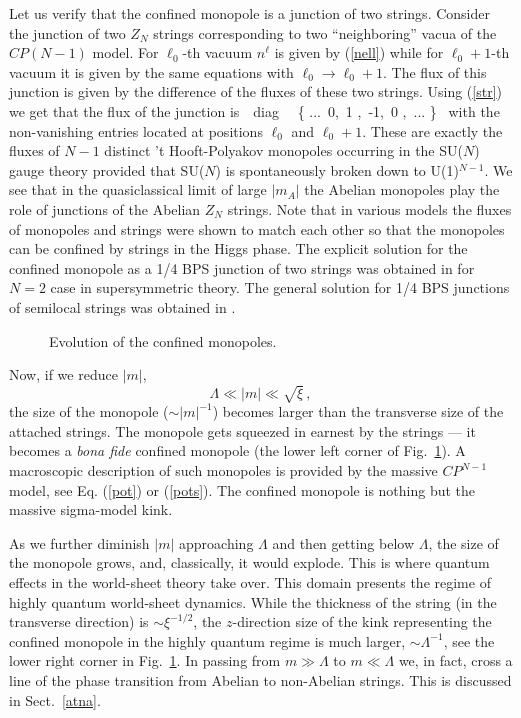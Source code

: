 Let us verify that the confined monopole is a junction of two strings.
Consider the junction of two $Z_N$ strings   corresponding to two 
``neighboring'' vacua of the $CP(N-1)$ model. For $\ell_0$-th vacuum $n^{\ell}$ 
is given by (\ref{nell}) while for $\ell_0 +1$-th vacuum it is given by the 
same equations with $\ell_0\to\ell_0 +1$. The flux of this junction is 
given by the difference of the fluxes of these two strings. Using (\ref{str})
we get that the flux of the junction is
\pi\,\times \, {\rm diag} \, \, \left\{  ...\, 0, \,1 ,\,  -1,\, 0
,\, ... \right\} \,
\label{monflux}
\eeq
with the non-vanishing entries located at 
positions $\ell_0$ and $\ell_0 +1$.
These are  exactly the  fluxes of $N-1$ distinct 't Hooft-Polyakov 
monopoles occurring in the 
SU($N$) gauge theory provided that SU($N$)
is spontaneously broken down to U(1)$^{N-1}$. We see that 
in the quasiclassical limit of large $| m_A|$ the Abelian 
monopoles play the role of junctions
of the Abelian $Z_N$ strings. Note that in various models 
the fluxes of monopoles and 
strings were shown \cite{Bais,PrVi,MY,Kn,ABEK} to match each other
so that the monopoles can be confined by strings in the Higgs phase.
The explicit solution for the confined monopole as a 1/4 BPS junction
of two strings was obtained in \cite{ShifmanYung} for $N=2$ case
in \ntwo supersymmetric theory. The general solution for 1/4 BPS junctions
of semilocal strings was obtained in \cite{INOS}.



\begin{figure}
\epsfxsize=9cm
\centerline{}
\caption{
Evolution of the confined monopoles.}
\label{sixf}
\end{figure}

Now, if we   reduce $\left|  m\right| $,
$$
\Lambda \ll \left|  m\right|   \ll \sqrt{\xi}\, ,
$$
the size of the monopole ($\sim \left|  m\right|^{-1} $) becomes
larger than the transverse size of the attached strings.
The monopole gets squeezed  in earnest by
the strings --- it becomes  a {\em bona fide} confined
monopole (the  lower left corner of  Fig.~\ref{sixf}).
A macroscopic description of such monopoles is provided
by  the massive $CP^{N-1}$ model, see Eq. (\ref{pot}) or (\ref{pots}).
The confined monopole is nothing but
the massive sigma-model kink.

As we further diminish $\left|  m\right|$
approaching $\Lambda$ and then getting  below $\Lambda$,
the size of the monopole grows, and, classically, it would explode.
This is where quantum effects in the world-sheet theory take over.
This domain presents the regime of
highly quantum world-sheet dynamics.
While the thickness of the string (in the transverse direction) is
$\sim \xi ^{-1/2}$, the
$z$-direction size of the kink  representing the confined
monopole in the highly quantum regime is much larger, 
$\sim \Lambda^{-1}$,
see the  lower right corner in  Fig.~\ref{sixf}.
In passing from $ m \gg \Lambda$ to 
$ m \ll \Lambda$ we, in fact, cross a line of the phase transition
from Abelian to non-Abelian strings.   
This is discussed in Sect.~\ref{atna}.

